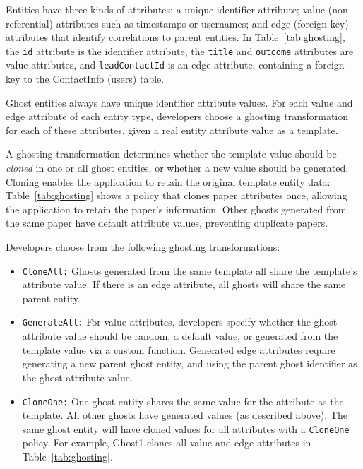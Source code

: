Entities have three kinds of attributes: a unique identifier attribute; value
(non-referential) attributes such as timestamps or usernames; and edge (foreign key)
attributes that identify correlations to parent entities.  
In Table~\ref{tab:ghosting}, the \texttt{id} attribute is the identifier attribute, the
\texttt{title} and \texttt{outcome} attributes are value attributes, and \texttt{leadContactId} is
an edge attribute, containing a foreign key to the ContactInfo (users) table. 

Ghost entities always have unique identifier attribute values.
For each value and edge attribute of each entity type, developers choose a ghosting transformation for each of these attributes, given a real entity
attribute value as a template.

A ghosting transformation determines whether the template value should be \emph{cloned} in one or
all ghost entities, or whether a new value should be generated.
Cloning enables the application to retain
the original template entity data: Table~\ref{tab:ghosting} shows a policy that clones
paper attributes once, allowing the application to retain the paper's information. Other ghosts
generated from the same paper have default attribute values, preventing duplicate papers.

Developers choose from the following ghosting transformations:
\begin{itemize}
    \item \texttt{CloneAll:} Ghosts generated from the same template all share the template's 
        attribute value. If there is an edge attribute, all ghosts will share the
        same parent entity.

    \item \texttt{GenerateAll:} 
        For value attributes, developers specify whether the ghost attribute value should be
        random, a default value, or generated from the template value via a custom function.
        Generated edge attributes require generating a new parent ghost entity, and using the parent ghost
        identifier as the ghost attribute value.

    \item \texttt{CloneOne:} One ghost entity shares the same value for the attribute as the
        template. All other ghosts have generated values (as described above).
        The same ghost entity will have cloned values for all attributes with a
        \texttt{CloneOne} policy. For example, Ghost1 clones all value and edge attributes in Table~\ref{tab:ghosting}.
\end{itemize}

